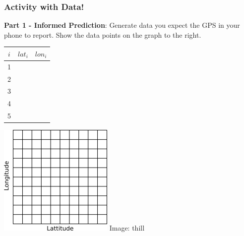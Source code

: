 \documentclass[fleqn]{beamer} %
\newcommand{\sectiontitleIV}{Activity with Data!}
\begin{document}
	\begin{frame}[label=sectionIV]
		\frametitle{\sectiontitleIV}
		\scriptsize
		{\bf Part 1 - Informed Prediction}: Generate data you expect the GPS in your phone to report. Show the data points on the graph to the right.  \\
		
		\begin{multicols}{2}
			\setlength{\tabcolsep}{20pt}
			\renewcommand{\arraystretch}{1.4}
			\begin{tabular}{|c|c|c|} \hline
			$i$ & $lat_i$ & $lon_i$ \\\hline
			  1  & &              \\ \hline
			  2  & &              \\ \hline
			  3  & &              \\ \hline
			  4  & &              \\ \hline
			  5  & &              \\ \hline

			\end{tabular}

			\includegraphics[scale=1]{lat_lon_grid.png}
			{\tiny Image: thill}
		\end{multicols}	

	\end{frame}
\end{document}
